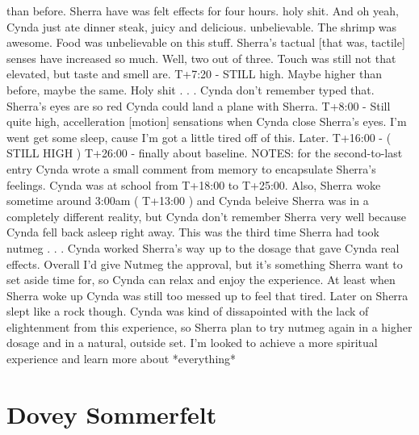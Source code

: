 \documentclass[12pt]{book}
\begin{document}
than before. Sherra have was felt effects for four hours. holy shit. And oh yeah, Cynda just ate dinner steak, juicy and delicious. unbelievable. The shrimp was awesome. Food was unbelievable on this stuff. Sherra's tactual [that was, tactile] senses have increased so much. Well, two out of three. Touch was still not that elevated, but taste and smell are. T+7:20 - STILL high. Maybe higher than before, maybe the same. Holy shit . . .  Cynda don't remember typed that. Sherra's eyes are so red Cynda could land a plane with Sherra. T+8:00 - Still quite high, accelleration [motion] sensations when Cynda close Sherra's eyes. I'm went get some sleep, cause I'm got a little tired off of this. Later. T+16:00 - ( STILL HIGH ) T+26:00 - finally about baseline. NOTES: for the second-to-last entry Cynda wrote a small comment from memory to encapsulate Sherra's feelings. Cynda was at school from T+18:00 to T+25:00. Also, Sherra woke sometime around 3:00am ( T+13:00 ) and Cynda beleive Sherra was in a completely different reality, but Cynda don't remember Sherra very well because Cynda fell back asleep right away. This was the third time Sherra had took nutmeg . . .  Cynda worked Sherra's way up to the dosage that gave Cynda real effects. Overall I'd give Nutmeg the approval, but it's something Sherra want to set aside time for, so Cynda can relax and enjoy the experience. At least when Sherra woke up Cynda was still too messed up to feel that tired. Later on Sherra slept like a rock though. Cynda was kind of dissapointed with the lack of elightenment from this experience, so Sherra plan to try nutmeg again in a higher dosage and in a natural, outside set. I'm looked to achieve a more spiritual experience and learn more about *everything*



\chapter{Dovey Sommerfelt}
\end{document}
